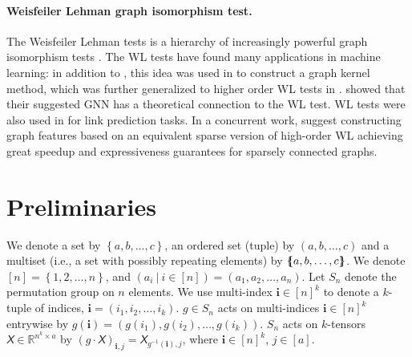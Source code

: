 \documentclass{article}
\newcommand{\set}[1]{\left\{#1\right\}}
\newcommand{\mmset}[1]{\{\kern-.4em\{ #1 \}\kern-.4em\}}
\newcommand{\Real}{\mathbb R}
\newcommand{\ie}{{i.e.}}
\def\vi{{\bm{i}}}
\newcommand{\tens}[1]{\bm{\mathsfit{#1}}}
\def\tX{{\tens{X}}}
\begin{document}
\paragraph{Weisfeiler Lehman graph isomorphism test.} The Weisfeiler Lehman tests is a hierarchy of increasingly powerful graph isomorphism tests \citep{grohe2017descriptive}. 
The WL tests have found many applications in machine learning: in addition to \cite{xu2018how,morris2018weisfeiler}, this idea was used in \cite{shervashidze2011weisfeiler} to construct a graph kernel method, which was further generalized to higher order WL tests in \cite{morris2017glocalized}. \citet{lei2017deriving} showed that their suggested GNN has a theoretical connection to the WL test. WL tests were also used in \cite{zhang2017weisfeiler} for link prediction tasks. In a concurrent work, \citet{morris2019towards} suggest constructing graph features based on an equivalent sparse version of high-order WL achieving great speedup and expressiveness guarantees for sparsely connected graphs. \vspace{-5pt}







\section{Preliminaries}\label{s:prelim}\vspace{-5pt}
We denote a set by $\set{a,b,\ldots,c}$, an ordered set (tuple) by $(a,b,\ldots,c)$ and a multiset (\ie, a set with possibly repeating elements) by $\mmset{a,b,\ldots,c}$. We denote $[n]=\set{1,2,\ldots,n}$, and $(a_i \ \vert \ i\in[n])=(a_1,a_2,\ldots,a_n)$. Let $S_n$ denote the permutation group on $n$ elements. 
We use multi-index $\vi\in[n]^k$ to denote a $k$-tuple of indices, $\vi=(i_1,i_2,\ldots,i_k)$. $g\in S_n$ acts on multi-indices $\vi\in [n]^k$ entrywise by $g(\vi)=(g(i_1), g(i_2), \ldots, g(i_k))$. 
$S_n$ acts on $k$-tensors $\tX\in\Real^{n^k\times a}$ by $(g\cdot \tX)_{\vi,j} = \tX_{g^{-1}(\vi),j}$, where $\vi\in [n]^k$, $j\in [a]$. 



\vspace{-5pt}
\end{document}
